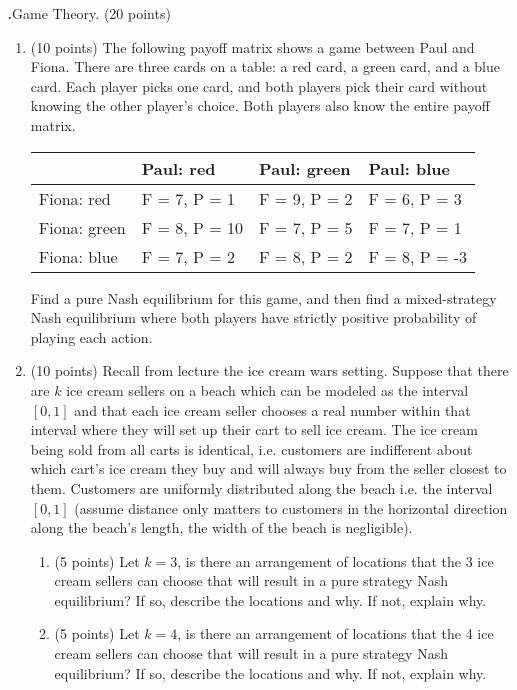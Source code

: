\documentclass[12pt]{amsart}
\newenvironment{statement}[1]{\smallskip\noindent\color[rgb]{0.0,0.0,0.0} {\bf #1.}}{}
\theoremstyle{definition}
\theoremstyle{remark}
\newcommand{\1}{\mathds{1}}
\begin{document}
\newpage
\begin{statement}{4}
\emph{Game Theory.} (20 points)
\begin{enumerate}
    \item (10 points) The following payoff matrix shows
a game between Paul and Fiona.
There are three cards on a table: a red card, a green card, and a blue card. Each player picks one card, and both players pick their card without knowing the other player's choice. Both players also know the entire payoff matrix.
\begin{center}
\begin{tabular}{l|l|l|l|}
                & Paul: red & Paul: green & Paul: blue  \\ \hline
Fiona: red   & F = 7, P = 1  & F = 9, P = 2    & F = 6, P = 3 \\ \hline
Fiona: green & F = 8, P = 10  & F = 7, P = 5    & F = 7, P = 1 \\ \hline
Fiona: blue     & F = 7, P = 2  & F = 8, P = 2    & F = 8, P = -3 \\ \hline
\end{tabular}
\end{center}
Find a pure Nash equilibrium for this game, and then find a mixed-strategy Nash equilibrium where both players have strictly positive probability of playing each action.

\vspace{5mm}

\item (10 points) Recall from lecture the ice cream wars setting. Suppose that there are $k$ ice cream sellers on a beach which can be modeled as the interval $[0,1]$ and that each ice cream seller chooses a real number within that interval where they will set up their cart to sell ice cream. The ice cream being sold from all carts is identical, i.e. customers are indifferent about which cart's ice cream they buy and will always buy from the seller closest to them. Customers are uniformly distributed along the beach i.e. the interval $[0,1]$ (assume distance only matters to customers in the horizontal direction along the beach's length, the width of the beach is negligible). 
\begin{enumerate}
    \item (5 points) Let $k=3$, is there an arrangement of locations that the 3 ice cream sellers can choose that will result in a pure strategy Nash equilibrium? If so, describe the locations and why. If not, explain why.
    \item (5 points) Let $k=4$, is there an arrangement of locations that the 4 ice cream sellers can choose that will result in a pure strategy Nash equilibrium? If so, describe the locations and why. If not, explain why.
\end{enumerate}
\end{enumerate}
\end{statement}
\end{document}
